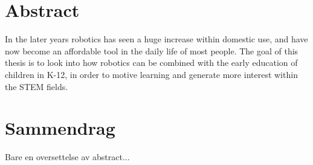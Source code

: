 \section*{Abstract}
	In the later years robotics has seen a huge increase within domestic use, and have now become an affordable tool in the daily life of most people.
	The goal of this thesis is to look into how robotics can be combined with the early education of children in K-12, 
	in order to motive learning and generate more interest within the STEM fields. 
	

\newpage
\section*{Sammendrag}
 Bare en oversettelse av abstract...
